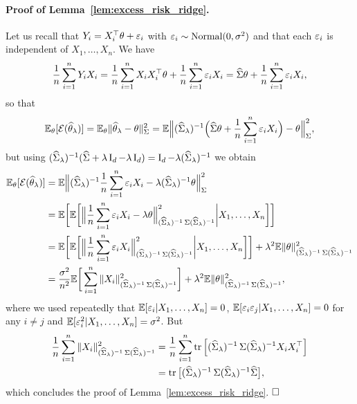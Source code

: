 \paragraph{Proof of Lemma~\ref{lem:excess_risk_ridge}.}

Let us recall that $Y_i = X_i^\top \theta + \eps_i$ with $\eps_i \sim \nor(0, \sigma^2)$ and that each $\eps_i$ is independent of $X_1, \ldots, X_n$.
We have
\begin{equation*}
	\frac 1n \sum_{i=1}^n Y_i X_i = \frac 1n \sum_{i=1}^n X_i X_i^\top \theta 
	+ \frac 1n \sum_{i=1}^n \eps_i X_i = \wh \bSigma \theta + \frac 1n \sum_{i=1}^n \eps_i X_i,
\end{equation*}
so that
\begin{equation*}
	\E_{\theta} [\cE(\wh \theta_\lambda)] 
	=  \E_{\theta} \norm{\wh \theta_\lambda - \theta}_{\bSigma}^2 
	= \E \Big\| (\wh \bSigma_\lambda)^{-1} \Big(\wh \bSigma \theta + \frac 1n \sum_{i=1}^n \eps_i X_i \Big) - \theta \Big\|_{\bSigma}^2,
\end{equation*}
but using $(\wh \bSigma_\lambda)^{-1} (\wh \bSigma + \lambda \bI_d - \lambda \bI_d) = \bI_d - \lambda 
(\wh \bSigma_\lambda)^{-1}$ we obtain
\begin{align*}
	\E_{\theta} [\cE(\wh \theta_\lambda)] &= \E \Big\| (\wh \bSigma_\lambda)^{-1} \frac 1n \sum_{i=1}^n \eps_i X_i - \lambda (\wh \bSigma_\lambda)^{-1} \theta \Big\|_{\bSigma}^2 \\
	&= \E \bigg[ \E \bigg[ \Big\| \frac 1n \sum_{i=1}^n \eps_i X_i - \lambda \theta \Big\|_{(\wh \bSigma_\lambda)^{-1} \bSigma (\wh \bSigma_\lambda)^{-1}}^2 \bigg| X_1, \ldots, X_n \bigg] \bigg] \\
	&= \E \bigg[ \E \bigg[ \Big\| \frac 1n \sum_{i=1}^n \eps_i X_i \Big\|_{(\wh \bSigma_\lambda)^{-1} \bSigma (\wh \bSigma_\lambda)^{-1}}^2 \bigg| X_1, \ldots, X_n \bigg] \bigg]  + \lambda^2 \E \norm{\theta}_{(\wh \bSigma_\lambda)^{-1} \bSigma (\wh \bSigma_\lambda)^{-1}}^2 \\
	&= \frac{\sigma^2}{n^2} \E \bigg[ \sum_{i=1}^n \norm{X_i}_{(\wh \bSigma_\lambda)^{-1} \bSigma (\wh \bSigma_\lambda)^{-1}}^2 \bigg]  + \lambda^2 \E \norm{\theta}_{(\wh \bSigma_\lambda)^{-1} \bSigma (\wh \bSigma_\lambda)^{-1}}^2,
\end{align*}
where we used repeatedly that $\E[\eps_i | X_1, \ldots, X_n] = 0$, $\E[\eps_i \eps_j | X_1, \ldots, X_n] = 0$ for any $i \neq j$ and $\E[\eps_i^2 | X_1, \ldots, X_n] = \sigma^2$.
But 
\begin{align*}
	\frac 1n \sum_{i=1}^n \norm{X_i}_{(\wh \bSigma_\lambda)^{-1} \bSigma (\wh \bSigma_\lambda)^{-1}}^2 
	&= \frac 1n \sum_{i=1}^n \tr \Big[ (\wh \bSigma_\lambda)^{-1} \bSigma (\wh \bSigma_\lambda)^{-1} X_i X_i^\top \Big] \\
	&= \tr \big[ (\wh \bSigma_\lambda)^{-1} \bSigma (\wh \bSigma_\lambda)^{-1} \wh \bSigma \big],
\end{align*}
which concludes the proof of Lemma~\ref{lem:excess_risk_ridge}. $\hfill \square$

